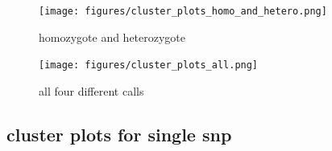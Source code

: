 \documentclass[a4paper,10pt]{article}
\begin{document}
\begin{figure}
\texttt{[image: figures/cluster\_plots\_homo\_and\_hetero.png]}
\caption{homozygote and heterozygote}\label{f9}
\end{figure}


\begin{figure}
\texttt{[image: figures/cluster\_plots\_all.png]}
\caption{all four different calls}\label{f10}
\end{figure}

\subsection{cluster plots for single snp}


\end{document}
